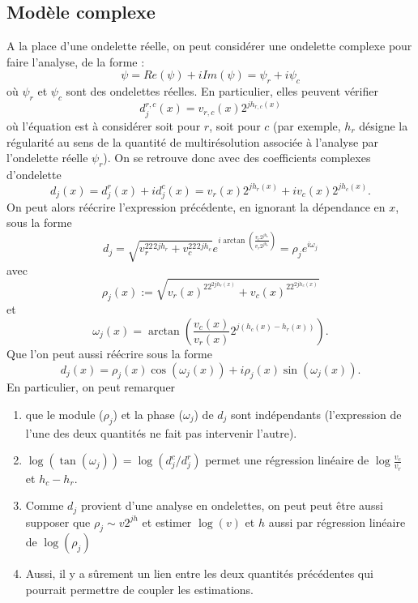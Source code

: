 \documentclass[11pt]{article} %
\begin{document}
\subsection{Modèle complexe}
A la place d'une ondelette réelle, on peut considérer une ondelette complexe pour faire l'analyse, de la forme :
\begin{equation}\label{eq:ondeletteC}
	\psi = Re(\psi) + iIm(\psi) = \psi_r + i\psi_c
\end{equation}
où $\psi_r$ et $\psi_c$ sont des ondelettes réelles. 
En particulier, elles peuvent vérifier
\begin{equation}\label{eq:modele}
	d_j^{r,c}(x) = v_{r,c}(x)2^{jh_{r,c}(x)}
\end{equation}
où l'équation est à considérer soit pour $r$, soit pour $c$ (par exemple, $h_r$ désigne la régularité au sens de la quantité de multirésolution associée à l'analyse par l'ondelette réelle $\psi_r$). On se retrouve donc avec des coefficients complexes d'ondelette
\begin{equation}
	d_j(x) = d_j^r(x) + id_j^c(x) = v_r(x)2^{jh_r(x)} + iv_c(x)2^{jh_c(x)}.
\end{equation}
On peut alors réécrire l'expression précédente, en ignorant la dépendance en $x$, sous la forme
\begin{equation}\label{eq:leadlead}
	d_j = \sqrt{v_r^22^{2jh_r} + v_c^22^{2jh_c} } e^{i \arctan{\left(\frac{v_c2^{jh_c}}{v_r2^{jh_r}} \right)} } = \rho_je^{i\omega_j}
\end{equation}
avec
\begin{equation}
	\rho_j(x) := \sqrt{v_r(x)^22^{2jh_r(x)} + v_c(x)^22^{2jh_c(x)} }
\end{equation}
et 
\begin{equation}
	\omega_j(x) = \arctan{\left(\frac{v_c(x)}{v_r(x)}2^{j(h_c(x) - h_r(x))} \right)}.
\end{equation}
Que l'on peut aussi réécrire sous la forme
\begin{equation}
	d_j(x) = \rho_j(x) \cos(\omega_j(x)) + i\rho_j(x)\sin(\omega_j(x)).
\end{equation}
En particulier, on peut remarquer 
\begin{enumerate}
	\item que le module ($\rho_j$) et la phase ($\omega_j$) de $d_j$ sont indépendants (l'expression de l'une des deux quantités ne fait pas intervenir l'autre).
	\item $\log(\tan(\omega_j)) =\log(d_j^c/d_j^r)$ permet une régression linéaire de $\log{\frac{v_c}{v_r}}$ et $h_c - h_r$.
	\item Comme $d_j$ provient d'une analyse en ondelettes, on peut peut être aussi supposer que $\rho_j \sim v2^{jh}$ et estimer $\log(v)$ et $h$ aussi par régression linéaire de $\log(\rho_j)$
	\item Aussi, il y a sûrement un lien entre les deux quantités précédentes qui pourrait permettre de coupler les estimations.
\end{enumerate}
\end{document}
